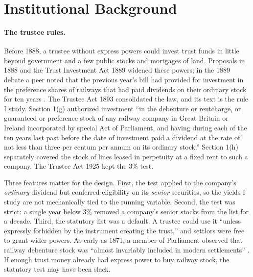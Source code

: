 \documentclass[11pt]{article}
\begin{document}
\section{Institutional Background}\label{sec:institutions}

\paragraph{The trustee rules.} Before 1888, a trustee without express powers could invest trust funds in little beyond government and a few public stocks and mortgages of land. Proposals in 1888 and the Trust Investment Act 1889 widened these powers; in the 1889 debate a peer noted that the previous year's bill had provided for investment in the preference shares of railways that had paid dividends on their ordinary stock for ten years \citep{Hansard1889}. The Trustee Act 1893 consolidated the law, and its text is the rule I study. Section 1(g) authorized investment ``in the debenture or rentcharge, or guaranteed or preference stock of any railway company in Great Britain or Ireland incorporated by special Act of Parliament, and having during each of the ten years last past before the date of investment paid a dividend at the rate of not less than three per centum per annum on its ordinary stock.'' Section 1(h) separately covered the stock of lines leased in perpetuity at a fixed rent to such a company. The Trustee Act 1925 kept the 3\% test.

Three features matter for the design. First, the test applied to the company's \textit{ordinary} dividend but conferred eligibility on its \textit{senior} securities, so the yields I study are not mechanically tied to the running variable. Second, the test was strict: a single year below 3\% removed a company's senior stocks from the list for a decade. Third, the statutory list was a default. A trustee could use it ``unless expressly forbidden by the instrument creating the trust,'' and settlors were free to grant wider powers. As early as 1871, a member of Parliament observed that railway debenture stock was ``almost invariably included in modern settlements'' \citep{Hansard1871}. If enough trust money already had express power to buy railway stock, the statutory test may have been slack.
\end{document}
